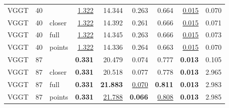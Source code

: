 \begin{table}[H]
\begin{tabular}{lrlrrrrrr}
VGGT & 40 &  & \underline{1.322} & 14.344 & 0.263 & 0.664 & \underline{0.015} & 0.070 \\
VGGT & 40 & closer & \underline{1.322} & 14.392 & 0.261 & 0.666 & \underline{0.015} & 0.071 \\
VGGT & 40 & full & \underline{1.322} & 14.345 & 0.263 & 0.666 & \underline{0.015} & 0.073 \\
VGGT & 40 & points & \underline{1.322} & 14.336 & 0.264 & 0.663 & \underline{0.015} & 0.070 \\
VGGT & 87 &  & \textbf{0.331} & 20.479 & 0.074 & 0.777 & \textbf{0.013} & 0.105 \\
VGGT & 87 & closer & \textbf{0.331} & 20.518 & 0.077 & 0.778 & \textbf{0.013} & 2.965 \\
VGGT & 87 & full & \textbf{0.331} & \textbf{21.883} & \underline{0.070} & \textbf{0.811} & \textbf{0.013} & 2.983 \\
VGGT & 87 & points & \textbf{0.331} & \underline{21.788} & \textbf{0.066} & \underline{0.808} & \textbf{0.013} & 2.985 \\
\bottomrule
\end{tabular}
\end{table}
